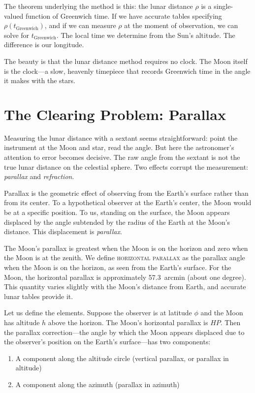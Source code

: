 The theorem underlying the method is this: the lunar distance $\rho$ is a single-valued function of Greenwich time. If we have accurate tables specifying $\rho(t_{\text{Greenwich}})$, and if we can measure $\rho$ at the moment of observation, we can solve for $t_{\text{Greenwich}}$. The local time we determine from the Sun's altitude. The difference is our longitude.

The beauty is that the lunar distance method requires no clock. The Moon itself is the clock—a slow, heavenly timepiece that records Greenwich time in the angle it makes with the stars.

\section{The Clearing Problem: Parallax}

Measuring the lunar distance with a sextant seems straightforward: point the instrument at the Moon and star, read the angle. But here the astronomer's attention to error becomes decisive. The raw angle from the sextant is not the true lunar distance on the celestial sphere. Two effects corrupt the measurement: \emph{parallax} and \emph{refraction}.

Parallax is the geometric effect of observing from the Earth's surface rather than from its center. To a hypothetical observer at the Earth's center, the Moon would be at a specific position. To us, standing on the surface, the Moon appears displaced by the angle subtended by the radius of the Earth at the Moon's distance. This displacement is \emph{parallax}.

The Moon's parallax is greatest when the Moon is on the horizon and zero when the Moon is at the zenith. We define \textsc{horizontal parallax} as the parallax angle when the Moon is on the horizon, as seen from the Earth's surface. For the Moon, the horizontal parallax is approximately \SI{57.3}{arcmin} (about one degree). This quantity varies slightly with the Moon's distance from Earth, and accurate lunar tables provide it.

Let us define the elements. Suppose the observer is at latitude $\phi$ and the Moon has altitude $h$ above the horizon. The Moon's horizontal parallax is $HP$. Then the parallax correction—the angle by which the Moon appears displaced due to the observer's position on the Earth's surface—has two components:
\begin{enumerate}
\item A component along the altitude circle (vertical parallax, or parallax in altitude)
\item A component along the azimuth (parallax in azimuth)
\end{enumerate}

